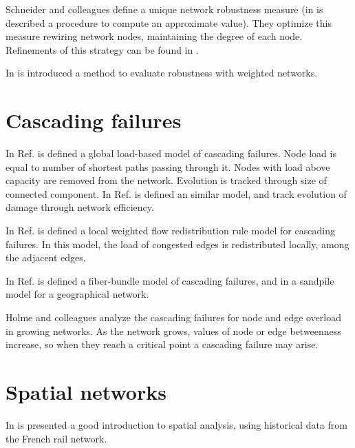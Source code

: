 \documentclass[12pt]{article}
\begin{document}
Schneider and colleagues \cite{Schneider2011} define a unique network robustness measure (in \cite{Hong2017} is described a procedure to compute an approximate value). They optimize this measure rewiring network nodes, maintaining the degree of each node. Refinements of this strategy can be found in \cite{Louzada2013, Yang2015, Zhou2014}.\medskip

In \cite{DallAsta2006} is introduced a method to evaluate robustness with weighted networks.

\section{Cascading failures}

In Ref. \cite{Motter2002} is defined a global load-based model of cascading failures. Node load is equal to number of shortest paths passing through it. Nodes with load above capacity are removed from the network. Evolution is tracked through size of connected component. In Ref. \cite{Crucitti2004} is defined an similar model, and track evolution of damage through network efficiency. \medskip

In Ref. \cite{Wang2008} is defined a local weighted flow redistribution rule model for cascading failures. In this model, the load of congested edges is redistributed locally, among the adjacent edges.\medskip

In Ref. \cite{Moreno2002} is defined a fiber-bundle model of cascading failures, and in \cite{Huang2006} a sandpile model for a geographical network.\medskip

Holme and colleagues analyze the cascading failures for node \cite{Holme2002b} and edge \cite{Holme2002c} overload in growing networks. As the network grows, values of node or edge betweenness increase, so when they reach a critical point a cascading failure may arise.\medskip

\section{Spatial networks}

In \cite{Bottinelli2019} is presented a good introduction to spatial analysis, using historical data from the French rail network.

\medskip

\nocite{*}



\end{document}
